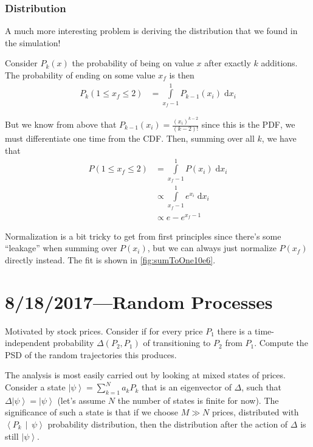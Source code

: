 \documentclass[12pt]{report}
\newcommand*{\dotp}[2]{\left<#1\,\middle|\,#2\right>}
\newcommand*{\ket}[1]{\left|#1\right>}
\begin{document}
\subsection{Distribution}

A much more interesting problem is deriving the distribution that we found in
the simulation!

Consider $P_k(x)$ the probability of being on value $x$ after exactly $k$
additions. The probability of ending on some value $x_f$ is then
\begin{align}
    P_k(1 \leq x_f \leq 2) &= \int\limits_{x_f - 1}^{1}P_{k - 1}(x_i)\;\mathrm{d}x_i
\end{align}

But we know from above that $P_{k - 1}(x_i) = \frac{(x_i)^{k - 2}}{(k - 2)!}$
since this is the PDF, we must differentiate one time from the CDF\@. Then,
summing over all $k$, we have that
\begin{align}
    P(1 \leq x_f \leq 2) &= \int\limits_{x_f - 1}^{1}P(x_i)\;\mathrm{d}x_i\\
        &\propto \int\limits_{x_f - 1}^{1}e^{x_i}\;\mathrm{d}x_i\\
        &\propto e - e^{x_f - 1}
\end{align}

Normalization is a bit tricky to get from first principles since there's some
``leakage'' when summing over $P(x_i)$, but we can always just normalize
$P(x_f)$ directly instead. The fit is shown in \autoref{fig:sumToOne10e6}.

\chapter{8/18/2017---Random Processes}

Motivated by stock prices. Consider if for every price $P_1$ there is a
time-independent probability $\Delta(P_2, P_1)$ of transitioning to $P_2$
from $P_1$. Compute the PSD of the random trajectories this produces.

The analysis is most easily carried out by looking at mixed states of prices.
Consider a state $\ket{\psi} = \sum\limits_{k=1}^{N} a_kP_k$ that is an
eigenvector of $\Delta$, such that $\Delta\ket{\psi} = \ket{\psi}$
(let's assume $N$ the number of states is finite for now). The significance of
such a state is that if we choose $M \gg N$ prices, distributed with
$\dotp{P_k}{\psi}$ probability distribution, then the distribution after the
action of $\Delta$ is still $\ket{\psi}$.
\end{document}
